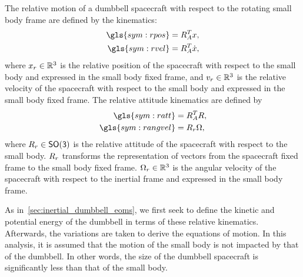 The relative motion of a dumbbell spacecraft with respect to the rotating small body frame are defined by the kinematics:
\begin{align}
    \gls{sym:rpos} &= R_A^T \vc{x}, \label{eq:relative_position} \\
    \gls{sym:rvel} &= R_A^T \dot{\vc{x}}, \label{eq:relative_velocity}
\end{align}
where \( x_r \in \mathbb{R}^3 \) is the relative position of the spacecraft with respect to the small body and expressed in the small body fixed frame, and \( v_r \in \mathbb{R}^3 \) is the relative velocity of the spacecraft with respect to the small body and expressed in the small body fixed frame.
The relative attitude kinematics are defined by
\begin{align}
    \gls{sym:ratt} &= R_A^T R, \label{eq:relative_attitude} \\
    \gls{sym:rangvel} &= \ratt  \vc{\Omega}, \label{eq:relative_angular_velocity}
\end{align}
where \( R_r \in \mathsf{SO(3)} \) is the relative attitude of the spacecraft with respect to the small body.
\( R_r \) transforms the representation of vectors from the spacecraft fixed frame to the small body fixed frame.
\( \Omega_r \in \mathbb{R}^3 \) is the angular velocity of the spacecraft with respect to the inertial frame and expressed in the small body frame.

As in~\cref{sec:inertial_dumbbell_eoms}, we first seek to define the kinetic and potential energy of the dumbbell in terms of these relative kinematics. 
Afterwards, the variations are taken to derive the equations of motion.
In this analysis, it is assumed that the motion of the small body is not impacted by that of the dumbbell.
In other words, the size of the dumbbell spacecraft is significantly less than that of the small body. 

